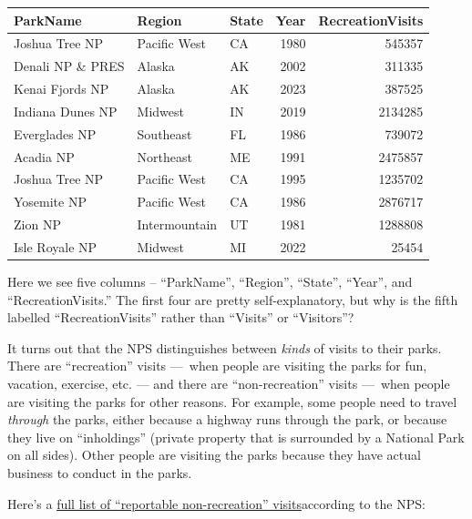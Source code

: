 \documentclass[
  letterpaper,
  DIV=11,
  numbers=noendperiod]{scrartcl}
\begin{document}
\begin{longtable}[]{@{}lllrr@{}}
\toprule\noalign{}
ParkName & Region & State & Year & RecreationVisits \\
\midrule\noalign{}
\endhead
\bottomrule\noalign{}
\endlastfoot
Joshua Tree NP & Pacific West & CA & 1980 & 545357 \\
Denali NP \& PRES & Alaska & AK & 2002 & 311335 \\
Kenai Fjords NP & Alaska & AK & 2023 & 387525 \\
Indiana Dunes NP & Midwest & IN & 2019 & 2134285 \\
Everglades NP & Southeast & FL & 1986 & 739072 \\
Acadia NP & Northeast & ME & 1991 & 2475857 \\
Joshua Tree NP & Pacific West & CA & 1995 & 1235702 \\
Yosemite NP & Pacific West & CA & 1986 & 2876717 \\
Zion NP & Intermountain & UT & 1981 & 1288808 \\
Isle Royale NP & Midwest & MI & 2022 & 25454 \\
\end{longtable}

Here we see five columns -- ``ParkName'', ``Region'', ``State'',
``Year'', and ``RecreationVisits.'' The first four are pretty
self-explanatory, but why is the fifth labelled ``RecreationVisits''
rather than ``Visits'' or ``Visitors''?

It turns out that the NPS distinguishes between \emph{kinds} of visits
to their parks. There are ``recreation'' visits ---~when people are
visiting the parks for fun, vacation, exercise, etc. --- and there are
``non-recreation'' visits ---~when people are visiting the parks for
other reasons. For example, some people need to travel \emph{through}
the parks, either because a highway runs through the park, or because
they live on ``inholdings'' (private property that is surrounded by a
National Park on all sides). Other people are visiting the parks because
they have actual business to conduct in the parks.

Here's a
\href{https://www.nps.gov/subjects/socialscience/nps-visitor-use-statistics-definitions.htm}{full
list of ``reportable non-recreation'' visits}according to the NPS:
\end{document}

